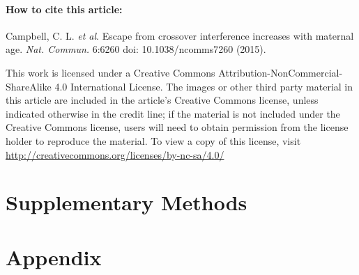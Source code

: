 \paragraph{How to cite this article:} Campbell, C. L. \textit{et al}. Escape from crossover interference
increases with maternal age. \textit{Nat. Commun.} 6:6260 doi: 10.1038/ncomms7260 (2015).

\bigskip \noindent
This work is licensed under a 
Creative Commons Attribution-NonCommercial-ShareAlike 4.0 International License. The images or
other third party material in this article are included in the article's Creative Commons
license, unless indicated otherwise in the credit line; if the material is not included under
the Creative Commons license, users will need to obtain permission from the license
holder to reproduce the material. To view a copy of this license, visit \\
\url{http://creativecommons.org/licenses/by-nc-sa/4.0/}



\section{Supplementary Methods}








\section{Appendix}
